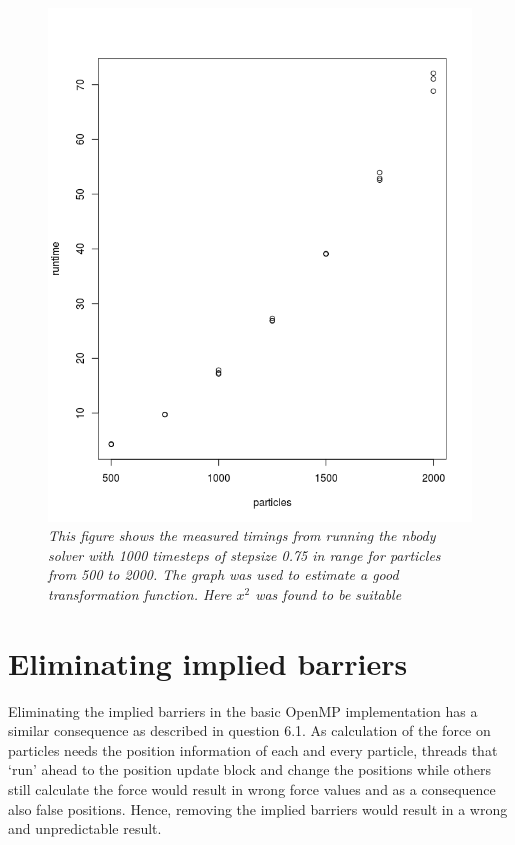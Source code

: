 \documentclass[a4paper,11pt,twoside]{article}
\begin{document}
\begin{figure}
  \centering
  \includegraphics[width=1\textwidth]{nbody.png}
  \caption{\textit{This figure shows the measured timings from running the nbody solver with 1000 timesteps of stepsize 0.75 in range for particles from 500 to 2000. The graph was used to estimate a good transformation function. Here $x^2$ was found to be suitable }}
  \label{fig:nbody}
\end{figure}

\section{Eliminating implied barriers}
Eliminating the implied barriers in the basic OpenMP implementation has a similar consequence as described in question 6.1. As calculation of the force on particles needs the position information of each and every particle, threads that `run' ahead to the position update block and change the positions while others still calculate the force would result in wrong force values and as a consequence also false positions. Hence, removing the implied barriers would result in a wrong and unpredictable result.
  
\end{document}
